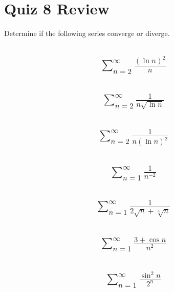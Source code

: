 \documentclass{article}
\begin{document}
\newpage
\section{Quiz 8 Review}
Determine if the following series converge or diverge.
\subsection{
	\begin{align*}
		\sum_{n = 2}^{\infty} \frac{(\ln{n})^2}{n}
	\end{align*}
}

\subsection{
	\begin{align*}
		\sum_{n = 2}^{\infty} \frac{1}{n\sqrt{\ln{n}}}
	\end{align*}
}

\subsection{
	\begin{align*}
		\sum_{n = 2}^{\infty} \frac{1}{n(\ln{n})^2}
	\end{align*}
}

\subsection{
	\begin{align*}
		\sum_{n = 1}^{\infty} \frac{1}{n^{-2}}
	\end{align*}
}

\subsection{
	\begin{align*}
		\sum_{n = 1}^{\infty} \frac{1}{2\sqrt{n} + \sqrt[3]{n}}
	\end{align*}
}

\subsection{
	\begin{align*}
		\sum_{n = 1}^{\infty} \frac{3 + \cos{n}}{n^2}
	\end{align*}
}

\subsection{
	\begin{align*}
		\sum_{n = 1}^{\infty} \frac{\sin^2{n}}{2^n}
	\end{align*}
}
\end{document}
